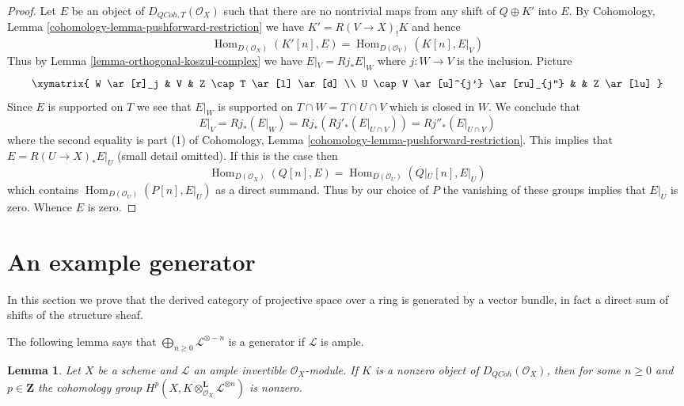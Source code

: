 \documentclass{stacks-project}
\theoremstyle{plain}
\newtheorem{lemma}[subsection]{Lemma}
\theoremstyle{definition}
\theoremstyle{remark}
\numberwithin{equation}{subsection}
\def\Hom{\mathop{\mathrm{Hom}}\nolimits}
\def\QCoh{\mathit{QCoh}}
\begin{document}
\begin{proof}
\medskip\noindent
Let $E$ be an object of $D_{\QCoh, T}(\mathcal{O}_X)$ such that
there are no nontrivial maps from any shift of $Q \oplus K'$ into $E$.
By Cohomology, Lemma \ref{cohomology-lemma-pushforward-restriction}
we have $K' =  R(V \to X)_! K$ and hence
$$
\Hom_{D(\mathcal{O}_X)}(K'[n], E) = \Hom_{D(\mathcal{O}_V)}(K[n], E|_V)
$$
Thus by Lemma \ref{lemma-orthogonal-koszul-complex} we have
$E|_V = Rj_*E|_W$ where $j : W \to V$ is the inclusion. Picture
$$
\xymatrix{
W \ar[r]_j & V & Z \cap T \ar[l] \ar[d] \\
U \cap V \ar[u]^{j'} \ar[ru]_{j''} & & Z \ar[lu]
}
$$
Since $E$ is supported on $T$ we see that $E|_W$ is supported on
$T \cap W = T \cap U \cap V$ which is closed in $W$.
We conclude that
$$
E|_V = Rj_*(E|_W) = Rj_*(Rj'_*(E|_{U \cap V})) = Rj''_*(E|_{U \cap V})
$$
where the second equality is part (1) of
Cohomology, Lemma \ref{cohomology-lemma-pushforward-restriction}.
This implies that $E = R(U \to X)_*E|_U$ (small detail omitted). If
this is the case then
$$
\Hom_{D(\mathcal{O}_X)}(Q[n], E) = \Hom_{D(\mathcal{O}_U)}(Q|_U[n], E|_U)
$$
which contains $\Hom_{D(\mathcal{O}_U)}(P[n], E|_U)$ as a direct summand.
Thus by our choice of $P$ the vanishing of these groups implies that $E|_U$
is zero. Whence $E$ is zero.
\end{proof}



\section{An example generator}
\label{section-example-generator}

\noindent
In this section we prove that the derived category of projective
space over a ring is generated by a vector bundle, in fact a direct
sum of shifts of the structure sheaf.

\medskip\noindent
The following lemma says that $\bigoplus_{n \geq 0} \mathcal{L}^{\otimes -n}$
is a generator if $\mathcal{L}$ is ample.

\begin{lemma}
\label{lemma-nonzero-some-cohomology}
Let $X$ be a scheme and $\mathcal{L}$ an ample invertible
$\mathcal{O}_X$-module. If $K$ is a nonzero object of
$D_\QCoh(\mathcal{O}_X)$, then for some $n \geq 0$ and $p \in \mathbf{Z}$
the cohomology group
$H^p(X, K \otimes_{\mathcal{O}_X}^\mathbf{L} \mathcal{L}^{\otimes n})$
is nonzero.
\end{lemma}
\end{document}
